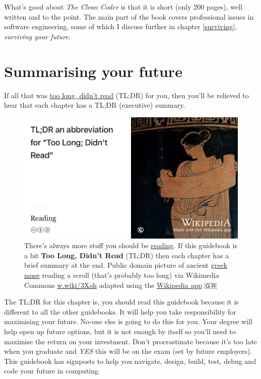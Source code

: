 \documentclass[
]{book}
\begin{document}
What's good about \emph{The Clean Coder} is that it is short (only 200 pages), well written and to the point. The main part of the book covers professional issues in software engineering, some of which I discuss further in chapter \ref{surviving}, \emph{surviving your future}.

\hypertarget{tldr1}{%
\section{Summarising your future}\label{tldr1}}

If all that was \href{https://en.wiktionary.org/wiki/too_long;_didn\%27t_read}{too long, didn't read} (TL;DR) for you, then you'll be relieved to hear that each chapter has a TL;DR (executive) summary.

\begin{figure}

{\centering \includegraphics[width=1\linewidth]{images/tldr} 

}

\caption{There's always more stuff you should be \href{https://cdyf.me/reading}{reading}. If this guidebook is a bit \textbf{Too Long, Didn't Read} (TL;DR) then each chapter has a brief summary at the end. Public domain picture of ancient \href{https://en.wikipedia.org/wiki/Muses}{greek muse} reading a scroll (that's probably too long) via Wikimedia Commons \href{https://w.wiki/3Xoh}{w.wiki/3Xoh} adapted using the \href{https://apps.apple.com/us/app/wikipedia/id324715238}{Wikipedia app} 🇬🇷}\label{fig:tldr-fig}
\end{figure}



The TL;DR for this chapter is, you should read this guidebook because it is different to all the other guidebooks. It will help you take responsibility for maximising your future. No-one else is going to do this for you. Your degree will help open up future options, but it is not enough by itself so you'll need to maximise the return on your investment. Don't procrastinate because it's too late when you graduate and \emph{YES} this will be on the exam (set by future employers). This guidebook has signposts to help you navigate, design, build, test, debug and code your future in computing.
\end{document}

